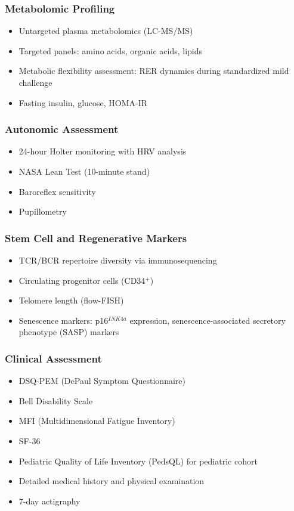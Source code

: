 \subsubsection{Metabolomic Profiling}
\begin{itemize}
    \item Untargeted plasma metabolomics (LC-MS/MS)
    \item Targeted panels: amino acids, organic acids, lipids
    \item Metabolic flexibility assessment: RER dynamics during standardized mild challenge
    \item Fasting insulin, glucose, HOMA-IR
\end{itemize}

\subsubsection{Autonomic Assessment}
\begin{itemize}
    \item 24-hour Holter monitoring with HRV analysis
    \item NASA Lean Test (10-minute stand)
    \item Baroreflex sensitivity
    \item Pupillometry
\end{itemize}

\subsubsection{Stem Cell and Regenerative Markers}
\begin{itemize}
    \item TCR/BCR repertoire diversity via immunosequencing
    \item Circulating progenitor cells (CD34$^+$)
    \item Telomere length (flow-FISH)
    \item Senescence markers: p16$^{INK4a}$ expression, senescence-associated secretory phenotype (SASP) markers
\end{itemize}

\subsubsection{Clinical Assessment}
\begin{itemize}
    \item DSQ-PEM (DePaul Symptom Questionnaire)
    \item Bell Disability Scale
    \item MFI (Multidimensional Fatigue Inventory)
    \item SF-36
    \item Pediatric Quality of Life Inventory (PedsQL) for pediatric cohort
    \item Detailed medical history and physical examination
    \item 7-day actigraphy
\end{itemize}

